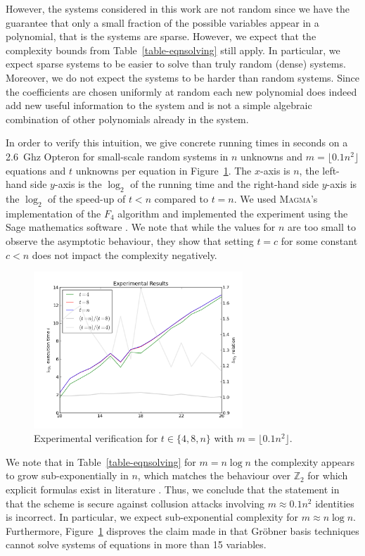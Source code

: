 \documentclass{llncs}
\newcommand{\ring}[1]{\mathbb{#1}}
\newcommand{\Z}{\ensuremath{\ring{Z}}\xspace}
\begin{document}
However, the systems considered in this work are not random since we have the guarantee that only a small fraction of the possible variables appear in a polynomial, that is the systems are sparse. However, we expect that the complexity bounds from Table~\ref{table-eqnsolving} still apply. In particular, we expect sparse systems to be easier to solve than truly random (dense) systems. Moreover, we do not expect the systems to be harder than random systems. Since the coefficients are chosen uniformly at random each new polynomial does indeed add new useful information to the system and is not a simple algebraic combination of other polynomials already in the system.

In order to verify this intuition, we give concrete running times in seconds on a 2.6~Ghz Opteron for small-scale random systems in $n$ unknowns and $m = \lfloor 0.1 n^2\rfloor$ equations and $t$ unknowns per equation in Figure~\ref{fig:experiments}. The $x$-axis is $n$, the left-hand side $y$-axis is the $\log_2$ of the running time and the right-hand side $y$-axis is the $\log_2$ of the speed-up of $t<n$ compared to $t=n$. We used \textsc{Magma}'s \cite{Magma} implementation of the $F_4$ algorithm and implemented the experiment using the Sage mathematics software \cite{Sage}. We note that while the values for $n$ are too small to observe the asymptotic behaviour, they show that setting $t=c$ for some constant $c<n$ does not impact the complexity negatively.

\begin{figure}
 \centering
 \includegraphics[width=0.7\textwidth,keepaspectratio=true]{experiments.png}
 \caption{Experimental verification for $t \in \{4,8,n\}$ with $m=\lfloor 0.1 n^2\rfloor$.}
 \label{fig:experiments}
\end{figure}

We note that in Table~\ref{table-eqnsolving} for $m = n \log n$ the complexity appears to grow sub-exponentially in $n$, which matches the behaviour over $\Z_2$ for which explicit formulas exist in literature \cite{Bardet}. Thus, we conclude that the statement in \cite{CCGHC10} that the scheme is secure against collusion attacks involving $m \approx 0.1n^2$ identities is incorrect. In particular, we expect sub-exponential complexity for $m \approx n \log n$. Furthermore, Figure~\ref{fig:experiments} disproves the claim made in \cite{susilo-baek:asiaccs2011} that Gröbner basis techniques cannot solve systems of equations in more than 15 variables.
\end{document}
